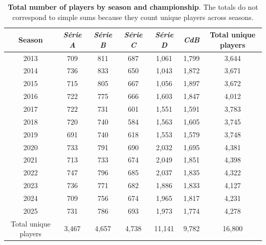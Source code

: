 \begin{table}[htbp]
    \centering
    \begin{tabular}{ccccccc}
        \toprule
        Season               & \textit{Série A} & \textit{Série B} & \textit{Série C} & \textit{Série D} & \textit{CdB}  & Total unique players \\
        \midrule
        2013                 & 709     & 811     & 687     & 1,061    & 1,799 & 3,644                 \\
        2014                 & 736     & 833     & 650     & 1,043    & 1,872 & 3,671                 \\
        2015                 & 715     & 805     & 667     & 1,056    & 1,897 & 3,672                 \\
        2016                 & 722     & 775     & 666     & 1,603    & 1,847 & 4,012                 \\
        2017                 & 722     & 731     & 601     & 1,551    & 1,591 & 3,783                 \\
        2018                 & 720     & 740     & 584     & 1,563    & 1,605 & 3,745                 \\
        2019                 & 691     & 740     & 618     & 1,553    & 1,579 & 3,748                 \\
        2020                 & 733     & 791     & 690     & 2,032    & 1,695 & 4,381                 \\
        2021                 & 713     & 733     & 674     & 2,049    & 1,851 & 4,398                 \\
        2022                 & 747     & 796     & 685     & 2,037    & 1,835 & 4,322                 \\
        2023                 & 736     & 771     & 682     & 1,886    & 1,833 & 4,127                 \\
        2024                 & 709     & 756     & 674     & 1,965    & 1,817 & 4,231                 \\
        2025                 & 731     & 786     & 693     & 1,973    & 1,774 & 4,278                 \\
        \midrule
        Total unique players & 3,467    & 4,657    & 4,738    & 11,141   & 9,782 & 16,800                \\
        \bottomrule
    \end{tabular}
    \caption{
        \textbf{Total number of players by season and championship}.
        The totals do not correspond to simple sums because they count unique players across seasons.
    }
    \label{tab:total_players}
\end{table}

